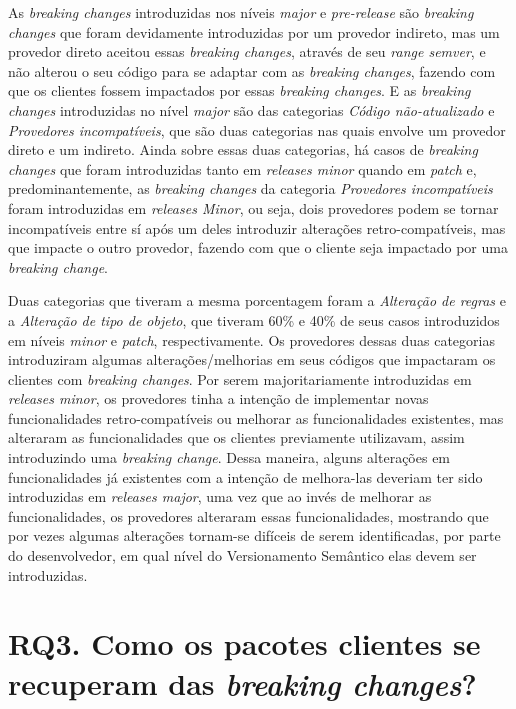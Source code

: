 As \textit{breaking changes} introduzidas nos níveis \textit{major} e \textit{pre-release} são \textit{breaking changes} que foram devidamente introduzidas por um provedor indireto, mas um provedor direto aceitou essas \textit{breaking changes}, através de seu \textit{range semver}, e  não alterou o seu código para se adaptar com as \textit{breaking changes}, fazendo com que os clientes fossem impactados por essas \textit{breaking changes}. E as \textit{breaking changes} introduzidas no nível \textit{major} são das categorias \textit{Código não-atualizado} e \textit{Provedores incompatíveis}, que são duas categorias nas quais envolve um provedor direto e um indireto. Ainda sobre essas duas categorias, há casos de \textit{breaking changes} que foram introduzidas tanto em \textit{releases minor} quando em \textit{patch} e, predominantemente,  as \textit{breaking changes} da categoria \textit{Provedores incompatíveis} foram introduzidas em \textit{releases Minor}, ou seja, dois provedores  podem se tornar incompatíveis entre sí após um deles introduzir alterações retro-compatíveis, mas que impacte o outro provedor, fazendo com que o cliente seja impactado por uma \textit{breaking change}.

Duas categorias que tiveram a mesma porcentagem foram a \textit{Alteração de regras} e a \textit{Alteração de tipo de objeto}, que tiveram 60\% e 40\% de seus casos introduzidos em níveis \textit{minor} e \textit{patch}, respectivamente. Os provedores dessas duas categorias introduziram algumas alterações/melhorias em seus códigos que impactaram os clientes com \textit{breaking changes}. Por serem majoritariamente introduzidas em \textit{releases minor}, os provedores tinha a intenção de implementar novas funcionalidades retro-compatíveis ou melhorar as funcionalidades existentes, mas alteraram as funcionalidades que os clientes previamente utilizavam, assim introduzindo uma \textit{breaking change}. Dessa maneira, alguns alterações em funcionalidades já existentes com a intenção de melhora-las deveriam ter sido introduzidas em \textit{releases major}, uma vez que ao invés de melhorar as funcionalidades, os provedores alteraram essas funcionalidades, mostrando que por vezes algumas alterações tornam-se difíceis de serem identificadas, por parte do desenvolvedor, em qual nível do Versionamento Semântico elas devem ser introduzidas.

\section{RQ3. Como os pacotes clientes se recuperam das \textit{breaking changes}?}

